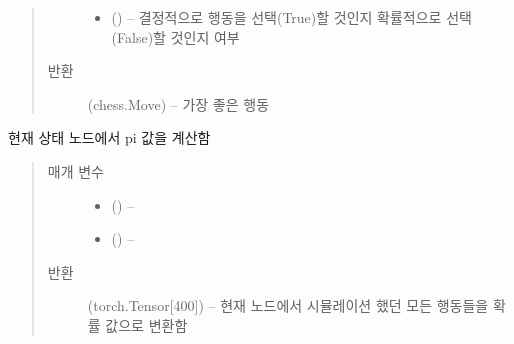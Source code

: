\documentclass[letterpaper,10pt,english]{sphinxmanual}
\begin{document}
\begin{fulllineitems}
\begin{fulllineitems}
\begin{quote}
\begin{description}
\begin{itemize}
\item {} 
 () -- 결정적으로 행동을 선택(True)할 것인지 확률적으로 선택(False)할 것인지 여부

\end{itemize}

\item[{반환}] \leavevmode
(chess.Move) -- 가장 좋은 행동

\end{description}\end{quote}

\end{fulllineitems}


\begin{fulllineitems}
\label{\detokenize{agents.self_learning:agents.self_learning.mcts.MCTSPlanner.pi}}
현재 상태 노드에서 pi 값을 계산함
\begin{quote}\begin{description}
\item[{매개 변수}] \leavevmode\begin{itemize}
\item {} 
 ({\hyperref[\detokenize{agents.self_learning:agents.self_learning.mcts.Node}]{}}) -- 

\item {} 
 () -- 

\end{itemize}

\item[{반환}] \leavevmode
(torch.Tensor{[}400{]}) -- 현재 노드에서 시뮬레이션 했던 모든 행동들을 확률 값으로 변환함

\end{description}\end{quote}

\end{fulllineitems}



\end{fulllineitems}
\end{document}
